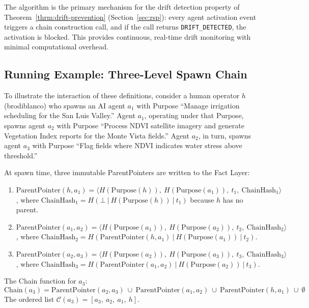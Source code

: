 The algorithm is the primary mechanism for the drift detection property of Theorem~\ref{thrm:drift-prevention} (Section~\ref{sec:rsp}): every agent activation event triggers a chain construction call, and if the call returns \texttt{DRIFT\_DETECTED}, the activation is blocked. This provides continuous, real-time drift monitoring with minimal computational overhead.

\subsection{Running Example: Three-Level Spawn Chain}

To illustrate the interaction of these definitions, consider a human operator $h$ (brodiblanco) who spawns an AI agent $a_1$ with Purpose ``Manage irrigation scheduling for the San Luis Valley.'' Agent $a_1$, operating under that Purpose, spawns agent $a_2$ with Purpose ``Process NDVI satellite imagery and generate Vegetation Index reports for the Monte Vista fields.'' Agent $a_2$, in turn, spawns agent $a_3$ with Purpose ``Flag fields where NDVI indicates water stress above threshold.''

At spawn time, three immutable ParentPointers are written to the Fact Layer:

\begin{enumerate}
  \item $\mathrm{ParentPointer}(h, a_1) = \langle H(\mathrm{Purpose}(h)),\ H(\mathrm{Purpose}(a_1)),\ t_1,\ \mathrm{ChainHash}_1 \rangle$, where $\mathrm{ChainHash}_1 = H(\bot\ \vert\ H(\mathrm{Purpose}(h))\ \vert\ t_1)$ because $h$ has no parent.
  \item $\mathrm{ParentPointer}(a_1, a_2) = \langle H(\mathrm{Purpose}(a_1)),\ H(\mathrm{Purpose}(a_2)),\ t_2,\ \mathrm{ChainHash}_2 \rangle$, where $\mathrm{ChainHash}_2 = H(\mathrm{ParentPointer}(h, a_1)\ \vert\ H(\mathrm{Purpose}(a_1))\ \vert\ t_2)$.
  \item $\mathrm{ParentPointer}(a_2, a_3) = \langle H(\mathrm{Purpose}(a_2)),\ H(\mathrm{Purpose}(a_3)),\ t_3,\ \mathrm{ChainHash}_3 \rangle$, where $\mathrm{ChainHash}_3 = H(\mathrm{ParentPointer}(a_1, a_2)\ \vert\ H(\mathrm{Purpose}(a_2))\ \vert\ t_3)$.
\end{enumerate}

The Chain function for $a_3$:
\[
\mathrm{Chain}(a_3) = \mathrm{ParentPointer}(a_2, a_3)\ \cup\ \mathrm{ParentPointer}(a_1, a_2)\ \cup\ \mathrm{ParentPointer}(h, a_1)\ \cup\ \emptyset
\]
The ordered list $\mathcal{C}(a_3) = [a_3,\ a_2,\ a_1,\ h]$.

